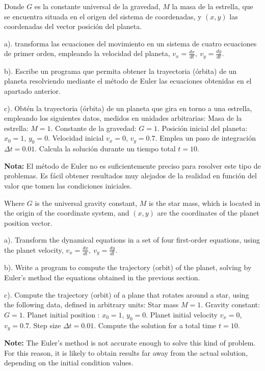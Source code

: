 \begin{paracol}{2}
Donde $G$ es la constante universal de la gravedad, $M$ la masa de la estrella, que se encuentra situada en el origen del sistema de coordenadas, y $(x,y)$ las coordenadas del vector posición del planeta.

a). transforma las ecuaciones del movimiento en un sistema de cuatro ecuaciones de primer orden, empleando la velocidad del planeta, $v_x = \frac{dx}{dt},\ v_y = \frac{dy}{dt} $. 

b). Escribe un programa que permita obtener la trayectoria (órbita) de un planeta resolviendo mediante el método de Euler las ecuaciones obtenidas en el apartado anterior.

c). Obtén la trayectoria (órbita) de un planeta que gira en torno a una estrella, empleando los siguientes datos, medidos en unidades arbitrarias: Masa de la estrella: $M=1$. Constante de la gravedad: $G=1$. Posición inicial del planeta: $x_0 = 1$, $y_0=0$. Velocidad inicial $v_x = 0$, $v_y = 0.7$. Emplea un paso de integración $\Delta t =0.01$. Calcula la solución durante un tiempo total $t = 10$.


\textbf{Nota:} El método de Euler no es suficientemente preciso para resolver este tipo de problemas. Es fácil obtener resultados muy alejados de la realidad en función del valor que tomen las condiciones iniciales. 

\switchcolumn
Where $G$ is the universal gravity constant, $M$ is the star mass, which is located in the origin of the coordinate system, and  $(x,y)$ are the coordinates of the planet position vector.

a). Transform the dynamical equations in a set of four first-order equations, using the planet velocity, $v_x = \frac{dx}{dt},\ v_y = \frac{dy}{dt} $.

b). Write a program to compute the trajectory (orbit) of the planet, solving by Euler's method the equations obtained in the previous section. 

c). Compute the trajectory (orbit) of a plane that rotates around a star, using the following data, defined in arbitrary units: Star mass $M=1$. Gravity constant: $G=1$. Planet initial position : $x_0 = 1$, $y_0=0$. Planet initial velocity $v_x = 0$, $v_y = 0.7$. Step size $\Delta t =0.01$. Compute the solution for a total time $t = 10$. 

\textbf{Note:} The Euler's method is not accurate enough to solve this kind of problem. For this reason, it is likely to obtain results far away from the actual solution, depending on the initial condition values.  
\end{paracol}


